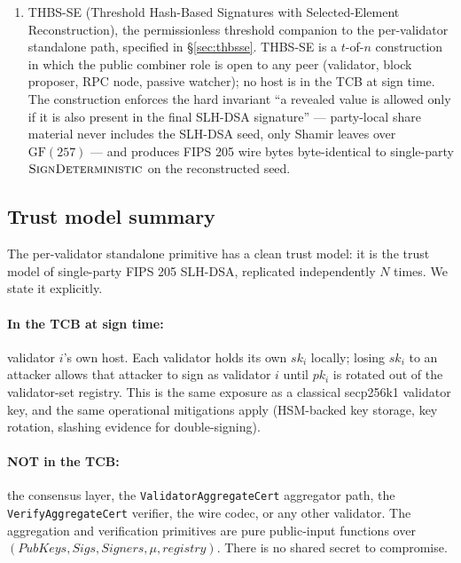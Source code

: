 \begin{enumerate}[leftmargin=2em,nosep]
        designed to feed the Z-Chain Groth16 rollup that compresses
        $N \times |\sigma|$ to a constant-size certificate.
  \item THBS-SE (Threshold Hash-Based Signatures with
        Selected-Element Reconstruction), the permissionless
        threshold companion to the per-validator standalone path,
        specified in \S\ref{sec:thbsse}. THBS-SE is a $t$-of-$n$
        construction in which the public combiner role is open to
        any peer (validator, block proposer, RPC node, passive
        watcher); no host is in the TCB at sign time. The
        construction enforces the hard invariant ``a revealed value
        is allowed only if it is also present in the final SLH-DSA
        signature'' --- party-local share material never includes
        the SLH-DSA seed, only Shamir leaves over $\mathrm{GF}(257)$
        --- and produces FIPS 205 wire bytes byte-identical to
        single-party $\textsc{SignDeterministic}$ on the
        reconstructed seed.
\end{enumerate}

\subsection{Trust model summary}
\label{sec:intro:trust}

The per-validator standalone primitive has a clean trust model: it is
the trust model of single-party FIPS 205 SLH-DSA, replicated
independently $N$ times. We state it explicitly.

\paragraph{In the TCB at sign time:} validator $i$'s own host. Each
validator holds its own $sk_i$ locally; losing $sk_i$ to an attacker
allows that attacker to sign as validator $i$ until $pk_i$ is rotated
out of the validator-set registry. This is the same exposure as a
classical secp256k1 validator key, and the same operational
mitigations apply (HSM-backed key storage, key rotation, slashing
evidence for double-signing).

\paragraph{NOT in the TCB:} the consensus layer, the
\texttt{ValidatorAggregateCert} aggregator path, the
\texttt{VerifyAggregateCert} verifier, the wire codec, or any other
validator. The aggregation and verification primitives are pure
public-input functions over $(\mathit{PubKeys}, \mathit{Sigs},
\mathit{Signers}, \mu, \mathit{registry})$. There is no shared
secret to compromise.

